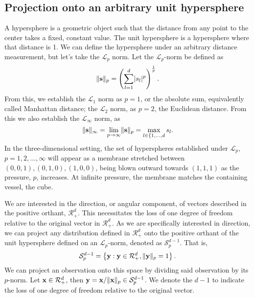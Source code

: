 \subsection{Projection onto an arbitrary unit hypersphere}
A hypersphere is a geometric object such that the distance from any point to the center takes a fixed,
  constant value.  The unit hypersphere is a hypersphere where that distance is 1. We can define the
  hypersphere under an arbitrary distance measurement, but let's take the $\mathcal{L}_p$ norm. Let
  the $\mathcal{L}_p$-norm be defined as
  \begin{equation*}
    \lVert {\bf s} \rVert_p = \left(\sum_{l = 1}^d \lvert s_l\rvert^p\right)^{\frac{1}{p}}.
  \end{equation*}
  From this, we establish the $\mathcal{L}_1$ norm as $p = 1$, or the absolute sum, equivalently called
  Manhattan distance; the $\mathcal{L}_2$ norm, as $p = 2$, the Euclidean distance.  From this we
  also establish the $\mathcal{L}_{\infty}$ norm, as
  \begin{equation*}
    \lVert {\bf s} \rVert_{\infty}
      = \lim\limits_{p\to\infty} \lVert {\bf s} \rVert_p
      = \max_{l\in\lbrace{1,\ldots,d}}s_l.
  \end{equation*}
  In the three-dimensional setting, the set of hyperspheres established under $\mathcal{L}_p$,
  $p = 1,2,\ldots,\infty$ will appear as a membrane stretched between $(0,0,1), (0,1,0), (1,0,0)$,
  being blown outward towards $(1,1,1)$ as the pressure, $p$, increases.  At infinite pressure, the
  membrane matches the containing vessel, the cube. 

We are interested in the direction, or angular component, of vectors described in the positive
  orthant, $\mathcal{R}_{+}^d$.  This necessitates the loss of one degree of freedom relative to the
  original vector in $\mathcal{R}_{+}^d$. As we are specifically interested in direction, we can
  project any distribution defined in $\mathcal{R}_{+}^d$ onto the positive orthant of the unit
  hypersphere defined on an $\mathcal{L}_p$-norm, denoted as $\mathcal{S}_{p}^{d-1}$.  That is,
  \begin{equation*}
    \mathcal{S}_{p}^{d-1} = \left\lbrace {\bf y} : {\bf y} \in \mathcal{R}_{+}^{d}, \lVert {\bf y}\rVert_{p} = 1\right\rbrace.
  \end{equation*}
  We can project an observation onto this space by dividing said observation by its $p$-norm. Let
  ${\bf x}\in \mathcal{R}_{+}^{d}$, then ${\bf y} = {\bf x} / \lVert {\bf x}\rVert_p \in \mathcal{S}_{p}^{d-1}$.
  We denote the $d-1$ to indicate the loss of one degree of freedom relative to the original vector.

